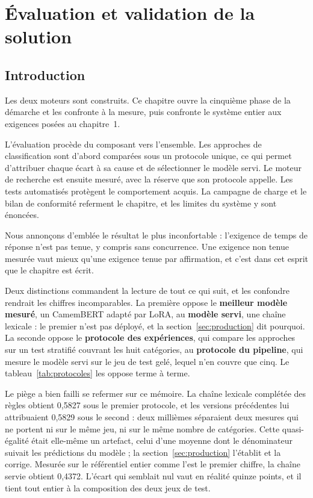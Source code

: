 \chapter{Évaluation et validation de la solution}

\section*{Introduction}

Les deux moteurs sont construits. Ce chapitre ouvre la cinquième phase de la démarche et les
confronte à la mesure, puis confronte le système entier aux exigences posées au chapitre~1.

L'évaluation procède du composant vers l'ensemble. Les approches de classification sont d'abord
comparées sous un protocole unique, ce qui permet d'attribuer chaque écart à sa cause et de
sélectionner le modèle servi. Le moteur de recherche est ensuite mesuré, avec la réserve que son
protocole appelle. Les tests automatisés protègent le comportement acquis. La campagne de charge et
le bilan de conformité referment le chapitre, et les limites du système y sont énoncées.

Nous annonçons d'emblée le résultat le plus inconfortable : l'exigence de temps de réponse n'est pas
tenue, y compris sans concurrence. Une exigence non tenue mesurée vaut mieux qu'une exigence tenue
par affirmation, et c'est dans cet esprit que le chapitre est écrit.

Deux distinctions commandent la lecture de tout ce qui suit, et les confondre rendrait les chiffres
incomparables. La première oppose le \textbf{meilleur modèle mesuré}, un CamemBERT adapté par LoRA,
au \textbf{modèle servi}, une chaîne lexicale : le premier n'est pas déployé, et la
section~\ref{sec:production} dit pourquoi. La seconde oppose le \textbf{protocole des expériences},
qui compare les approches sur un test stratifié couvrant les huit catégories, au \textbf{protocole
du pipeline}, qui mesure le modèle servi sur le jeu de test gelé, lequel n'en couvre que cinq. Le
tableau~\ref{tab:protocoles} les oppose terme à terme.

Le piège a bien failli se refermer sur ce mémoire. La chaîne lexicale complétée des règles obtient
0,5827 sous le premier protocole, et les versions précédentes lui attribuaient 0,5829 sous le
second : deux millièmes séparaient deux mesures qui ne portent ni sur le même jeu, ni sur le même
nombre de catégories. Cette quasi-égalité était elle-même un artefact, celui d'une moyenne dont le
dénominateur suivait les prédictions du modèle ; la section~\ref{sec:production} l'établit et la
corrige. Mesurée sur le référentiel entier comme l'est le premier chiffre, la chaîne servie obtient
0,4372. L'écart qui semblait nul vaut en réalité quinze points, et il tient tout entier à la
composition des deux jeux de test.

